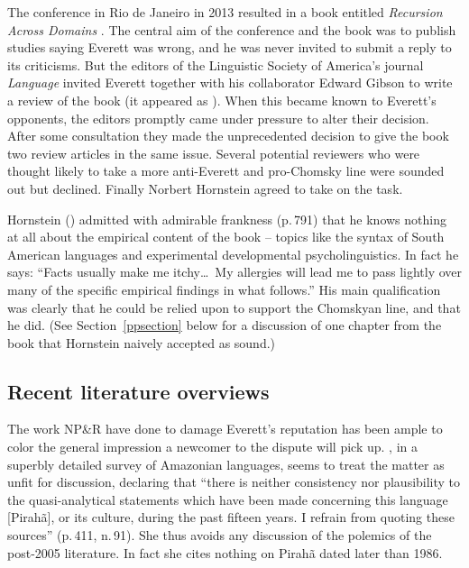 \documentclass[output=paper,colorlinks,citecolor=brown
]{langscibook}
\begin{document}
The conference in Rio de Janeiro in 2013 resulted in a book entitled
\textit{Recursion Across Domains} \citep{AmMaNeRo18}. The central aim
of the conference and the book was to publish studies saying Everett
was wrong, and he was never invited to submit a reply to its
criticisms. But the editors of the Linguistic Society of America's
journal \textit{Language} invited Everett together with his
collaborator Edward Gibson to write a review of the book (it appeared
as \citealt{EverGibs19}). When this became known to Everett's
opponents, the editors promptly came under pressure to alter their
decision. After some consultation they made the unprecedented decision
to give the book two review articles in the same issue. Several
potential reviewers who were thought likely to take a more anti-Everett
and pro-Chomsky line were sounded out but declined. Finally Norbert
Hornstein agreed to take on the task.

Hornstein (\citeyear{Hornstein19}) admitted with admirable frankness
(p.\,791) that he knows nothing at all about the empirical content
of the book -- topics like the syntax of South American languages
and experimental developmental psycholinguistics. In fact he says:
``Facts usually make me itchy\ldots\ My allergies will lead me to pass
lightly over many of the specific empirical findings in what follows.''
His main qualification was clearly that he could be relied upon to
support the Chomskyan line, and that he did. (See Section~\ref{ppsection}
below for a discussion of one chapter from the book that Hornstein
naively accepted as sound.)

\subsection{Recent literature overviews}

The work NP\&R have done to damage Everett's reputation has been ample
to color the general impression a newcomer to the dispute will pick up.
\citet{Aikhenvald12}, in a superbly detailed survey of Amazonian
languages, seems to treat the matter as unfit for discussion,
declaring that ``there is neither consistency nor plausibility to the
quasi-analytical statements which have been made concerning this
language [Pirah{\~a}], or its culture, during the past fifteen years.
I refrain from quoting these sources'' (p.\,411, n.\,91). She thus
avoids any discussion of the polemics of the post-2005 literature.
In fact she cites nothing on Pirah{\~a} dated later than 1986.
\end{document}
